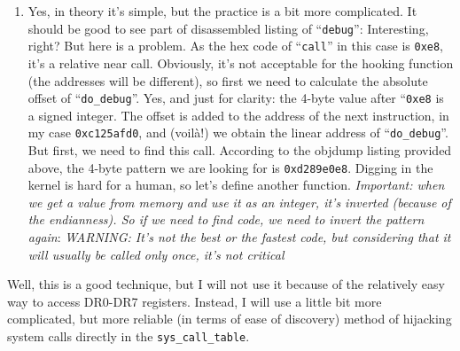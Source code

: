 \documentclass[12pt]{book}
\begin{document}
\begin{enumerate}
   \item Yes, in theory it's simple, but the practice is a bit more
     complicated. It should be good to see part of disassembled listing of
     ``\verb!debug!'':
      Interesting, right? But here is a problem. As the
     hex code of ``\verb!call!'' in this case is \verb!0xe8!, it's a relative
     near call. Obviously, it's not acceptable for the hooking function (the
     addresses will be different), so first we need to calculate the absolute
     offset of ``\verb!do_debug!''. Yes, and just for clarity: the 4-byte
     value after ``\verb!0xe8! is a signed integer. The offset is added to the
     address of the next instruction, in my case \verb!0xc125afd0!, and
     (voilà!) we obtain the linear address of ``\verb!do_debug!''. But first,
     we need to find this call. According to the objdump listing provided
     above, the 4-byte pattern we are looking for is
     \verb!0xd289e0e8!. Digging in the kernel is hard for a human, so let's
     define another function.  \emph{Important: when we get a value from
       memory and use it as an integer, it's inverted (because of the
       endianness). So if we need to find code, we need to invert the pattern
       again}:  \emph{WARNING: It's not the best or
       the fastest code, but considering that it will usually be called only
       once, it's not critical}
  \end{enumerate}
  Well, this is a good technique, but I will not use it because of the
  relatively easy way to access DR0-DR7 registers. Instead, I will use a
  little bit more complicated, but more reliable (in terms of ease of
  discovery) method of hijacking system calls directly in the
  \verb!sys_call_table!.
\end{document}
